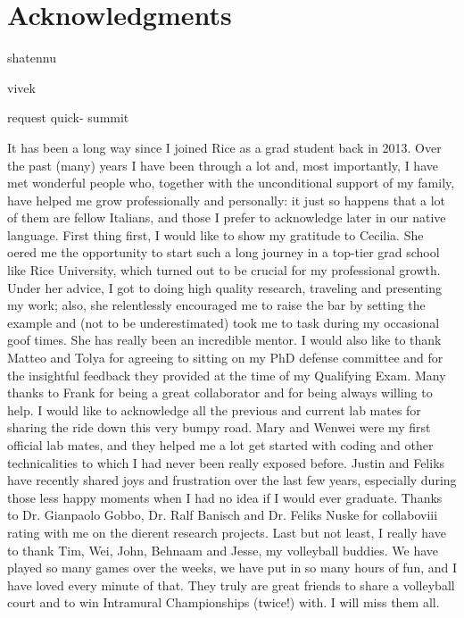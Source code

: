 \chapter{Acknowledgments}


shatennu

vivek

request quick- summit

It has been a long way since I joined Rice as a grad student back in 2013. Over the past
(many) years I have been through a lot and, most importantly, I have met wonderful people
who, together with the unconditional support of my family, have helped me grow professionally
and personally: it just so happens that a lot of them are fellow Italians, and those
I prefer to acknowledge later in our native language.
First thing first, I would like to show my gratitude to Cecilia. She oered me the opportunity
to start such a long journey in a top-tier grad school like Rice University, which
turned out to be crucial for my professional growth. Under her advice, I got to doing high
quality research, traveling and presenting my work; also, she relentlessly encouraged me to
raise the bar by setting the example and (not to be underestimated) took me to task during
my occasional goof times. She has really been an incredible mentor.
I would also like to thank Matteo and Tolya for agreeing to sitting on my PhD defense
committee and for the insightful feedback they provided at the time of my Qualifying Exam.
Many thanks to Frank for being a great collaborator and for being always willing to help.
I would like to acknowledge all the previous and current lab mates for sharing the ride
down this very bumpy road. Mary and Wenwei were my first official lab mates, and they
helped me a lot get started with coding and other technicalities to which I had never been
really exposed before. Justin and Feliks have recently shared joys and frustration over the
last few years, especially during those less happy moments when I had no idea if I would
ever graduate.
Thanks to Dr. Gianpaolo Gobbo, Dr. Ralf Banisch and Dr. Feliks Nuske for collaboviii
rating with me on the dierent research projects.
Last but not least, I really have to thank Tim, Wei, John, Behnaam and Jesse, my
volleyball buddies. We have played so many games over the weeks, we have put in so many
hours of fun, and I have loved every minute of that. They truly are great friends to share a
volleyball court and to win Intramural Championships (twice!) with. I will miss them all.
